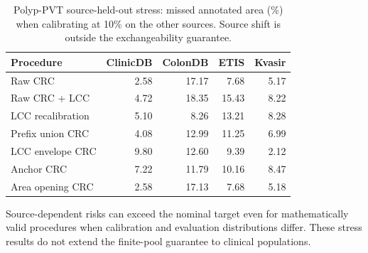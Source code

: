 \begin{table}[htbp]\centering\small\caption{Polyp-PVT source-held-out stress: missed annotated area (\%) when calibrating at 10\% on the other sources. Source shift is outside the exchangeability guarantee.}
\begin{tabular}{lrrrr}\toprule
Procedure & ClinicDB & ColonDB & ETIS & Kvasir\\\midrule
Raw CRC & 2.58 & 17.17 & 7.68 & 5.17 \\
Raw CRC + LCC & 4.72 & 18.35 & 15.43 & 8.22 \\
LCC recalibration & 5.10 & 8.26 & 13.21 & 8.28 \\
Prefix union CRC & 4.08 & 12.99 & 11.25 & 6.99 \\
LCC envelope CRC & 9.80 & 12.60 & 9.39 & 2.12 \\
Anchor CRC & 7.22 & 11.79 & 10.16 & 8.47 \\
Area opening CRC & 2.58 & 17.13 & 7.68 & 5.18 \\
\bottomrule\end{tabular}\end{table}
Source-dependent risks can exceed the nominal target even for mathematically valid procedures when calibration and evaluation distributions differ. These stress results do not extend the finite-pool guarantee to clinical populations.
